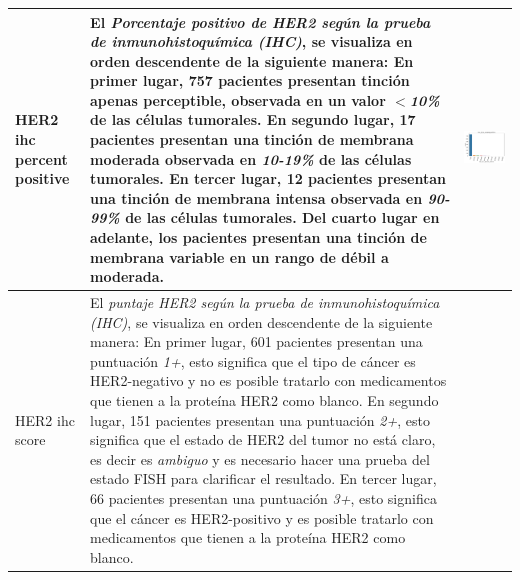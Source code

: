 \begin{table}[!htb]
	\footnotesize
	\begin{threeparttable}
		\begin{tabular}{p{2.5cm} p{7cm} p{6.5cm}} \toprule
			HER2 ihc percent positive
			& El \textit{Porcentaje positivo de HER2 según la prueba de inmunohistoquímica (IHC)}, se visualiza en orden descendente de la siguiente manera: En primer lugar, 757 pacientes presentan tinción apenas perceptible, observada en un valor $<$\textit{10\%} de las células tumorales. En segundo lugar, 17 pacientes presentan una tinción de membrana moderada observada en \textit{10-19\%} de las células tumorales. En tercer lugar, 12 pacientes presentan una tinción de membrana intensa observada en \textit{90-99\%} de las células tumorales. Del cuarto lugar en adelante, los pacientes presentan una tinción de membrana variable en un rango de débil a moderada.
			& \begin{center}\includegraphics[width=1\linewidth]{NOTEBOOK/IMAGENES_DESCRIPTIVAS/20_her_2_ihc_percent_positive}\end{center}
			\\ \hline
			
			HER2 ihc score
			& El \textit{puntaje HER2 según la prueba de inmunohistoquímica (IHC)}, se visualiza en orden descendente de la siguiente manera: En primer lugar, 601 pacientes presentan una puntuación \textit{1+}, esto significa  que el tipo de cáncer es HER2-negativo y no es posible tratarlo con medicamentos que tienen a la proteína HER2 como blanco. En segundo lugar, 151 pacientes presentan una puntuación \textit{2+}, esto significa que el estado de HER2 del tumor no está claro, es decir es \textit{ambiguo} y es necesario hacer una prueba del estado FISH para clarificar el resultado. En tercer lugar, 66 pacientes presentan una puntuación \textit{3+}, esto significa que el cáncer es HER2-positivo y es posible tratarlo con medicamentos que tienen a la proteína HER2 como blanco.
			

\end{tabular}
\end{threeparttable}
\end{table}
